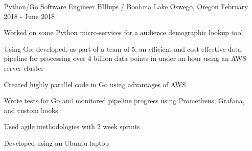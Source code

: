 \begin{cventries}
\cventry
{Python/Go Software Engineer} %
{BIllups / Boohma} %
{Lake Oswego, Oregon} %
{February 2018 - June 2018} %
{
  \begin{cvitems} %
    \item {Worked on some Python micro-services for a audience demographic lookup tool}
    \item {Using Go, developed, as part of a team of 5, an efficient and cost effective data pipeline for processing over 4 billion data points in under an hour using an AWS server cluster}
    \item {Created highly parallel code in Go using advantages of AWS}
    \item {Wrote tests for Go and monitored pipeline progress using Prometheus, Grafana, and custom hooks}
    \item {Used agile methodologies with 2 week sprints}
    \item {Developed using an Ubuntu laptop}
  \end{cvitems}
}


\end{cventries}
